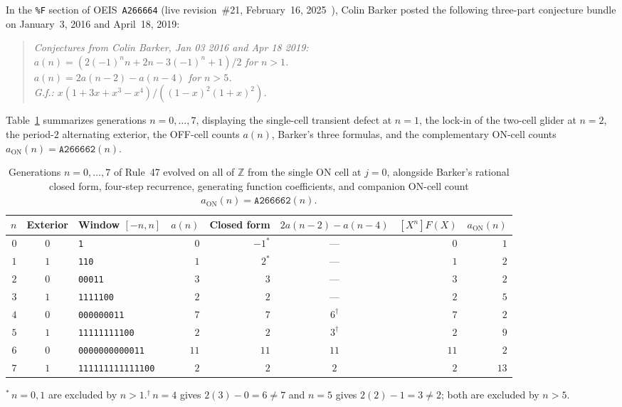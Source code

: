 \documentclass[11pt]{article}
\theoremstyle{definition}
\newcommand{\Z}{\mathbb{Z}}
\newcommand{\seq}[1]{\texttt{#1}}
\begin{document}
In the \texttt{\%F} section of OEIS~\seq{A266664} (live revision~\#21, February~16, 2025~\cite{oeis266664}), Colin Barker posted the following three-part conjecture bundle on January~3, 2016 and April~18, 2019:
\begin{quote}\itshape
Conjectures from Colin Barker, Jan 03 2016 and Apr 18 2019:\\
$a(n) = (2(-1)^n n + 2n - 3(-1)^n + 1)/2$ for $n > 1$.\\
$a(n) = 2a(n - 2) - a(n - 4)$ for $n > 5$.\\
G.f.: $x(1 + 3x + x^3 - x^4) / ((1 - x)^2(1 + x)^2)$.
\end{quote}
Table~\ref{tab:small-n} summarizes generations $n = 0, \dots, 7$, displaying the single-cell transient defect at $n = 1$, the lock-in of the two-cell glider at $n = 2$, the period-$2$ alternating exterior, the OFF-cell counts $a(n)$, Barker's three formulas, and the complementary ON-cell counts $a_{\mathrm{ON}}(n) = \seq{A266662}(n)$.

\begin{table}[ht]
\centering
\caption{Generations $n = 0, \dots, 7$ of Rule~47 evolved on all of $\Z$ from the single ON cell at $j = 0$, alongside Barker's rational closed form, four-step recurrence, generating function coefficients, and companion ON-cell count $a_{\mathrm{ON}}(n) = \seq{A266662}(n)$.}
\label{tab:small-n}
\smallskip
{\small
\begin{tabular}{@{}r c l r r c r r@{}}
\toprule
$n$ & Exterior & Window $[-n, n]$ & $a(n)$ & Closed form & $2a(n-2) - a(n-4)$ & $[X^n]F(X)$ & $a_{\mathrm{ON}}(n)$ \\
\midrule
$0$ & $0$ & \texttt{1} & $0$ & $-1^*$ & --- & $0$ & $1$ \\
$1$ & $1$ & \texttt{110} & $1$ & $2^*$ & --- & $1$ & $2$ \\
$2$ & $0$ & \texttt{00011} & $3$ & $3$ & --- & $3$ & $2$ \\
$3$ & $1$ & \texttt{1111100} & $2$ & $2$ & --- & $2$ & $5$ \\
$4$ & $0$ & \texttt{000000011} & $7$ & $7$ & $6^\dagger$ & $7$ & $2$ \\
$5$ & $1$ & \texttt{11111111100} & $2$ & $2$ & $3^\dagger$ & $2$ & $9$ \\
$6$ & $0$ & \texttt{0000000000011} & $11$ & $11$ & $11$ & $11$ & $2$ \\
$7$ & $1$ & \texttt{111111111111100} & $2$ & $2$ & $2$ & $2$ & $13$ \\
\bottomrule
\end{tabular}

\smallskip
{\footnotesize ${}^*$\,$n = 0, 1$ are excluded by $n > 1$.\quad ${}^\dagger$\,$n = 4$ gives $2(3) - 0 = 6 \ne 7$ and $n = 5$ gives $2(2) - 1 = 3 \ne 2$; both are excluded by $n > 5$.}
}
\end{table}
\end{document}

